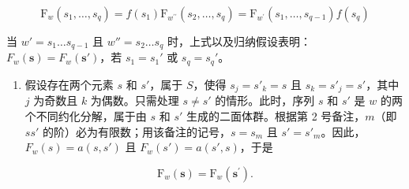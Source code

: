 \[
\mathrm{F} _ {w} \left(s _ {1}, \dots , s _ {q}\right) = f \left(s _ {1}\right) \mathrm{F} _ {w ^ {\prime \prime}} \left(s _ {2}, \dots , s _ {q}\right) = \mathrm{F} _ {w ^ {\prime}} \left(s _ {1}, \dots , s _ {q - 1}\right) f \left(s _ {q}\right)
\]

当 \(w' = s_1 \ldots s_{q-1}\) 且 \(w'' = s_2 \ldots s_q\) 时，上式以及归纳假设表明：\(F_w(\mathbf{s}) = F_w(\mathbf{s}')\)，若 \(s_1 = s_1'\) 或 \(s_q = s_q'\)。

\begin{enumerate}
\def\labelenumi{\alph{enumi})}
\setcounter{enumi}{1}
\tightlist
\item
  假设存在两个元素 \(s\) 和 \(s'\)，属于 \(S\)，使得 \(s_j = s'_k = s\) 且 \(s_k = s'_j = s'\)，其中 \(j\) 为奇数且 \(k\) 为偶数。只需处理 \(s \neq s'\) 的情形。此时，序列 \(s\) 和 \(s'\) 是 \(w\) 的两个不同约化分解，属于由 \(s\) 和 \(s'\) 生成的二面体群。根据第 2 号备注，\(m\)（即 \(ss'\) 的阶）必为有限数；用该备注的记号，\(s = s_m\) 且 \(s' = s'_m\)。因此，\(F_w(s) = a(s, s')\) 且 \(F_w(s') = a(s', s)\)，于是
\end{enumerate}

\[
\mathrm{F} _ {w} (\mathbf {s}) = \mathrm{F} _ {w} (\mathbf {s} ^ {\prime}).
\]


